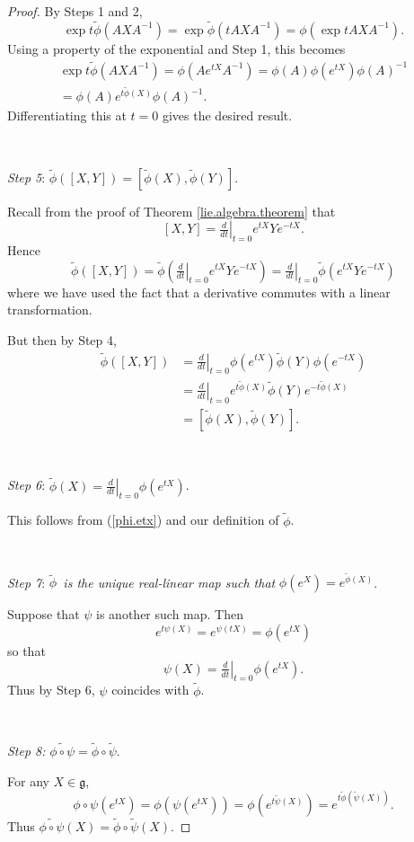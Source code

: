 \documentclass[12pt]{amsbook}
\let \frak = \mathfrak
\theoremstyle{plain}
\numberwithin{equation}{chapter}
\numberwithin{theorem}{chapter}
\begin{document}
\begin{proof}
By Steps 1 and 2,
\[
\exp t\widetilde{\phi}(AXA^{-1})=\exp\widetilde{\phi}(tAXA^{-1})=\phi\left(
\exp tAXA^{-1}\right)  \text{.}%
\]
Using a property of the exponential and Step 1, this becomes
\begin{align*}
\exp t\widetilde{\phi}(AXA^{-1})=\phi\left(  Ae^{tX}A^{-1}\right)
=\phi(A)\phi(e^{tX})\phi(A)^{-1}\\
=\phi(A)e^{t\widetilde{\phi}(X)}\phi(A)^{-1}\text{.}%
\end{align*}
Differentiating this at $t=0$ gives the desired result.

\ \ 

\textit{Step 5}: $\widetilde{\phi}(\left[  X,Y\right]  )=\left[
\widetilde{\phi}(X),\widetilde{\phi}(Y)\right]  $.

Recall from the proof of Theorem \ref{lie.algebra.theorem} that
\[
\left[  X,Y\right]  =\left.  \tfrac{d}{dt}\right|  _{t=0}e^{tX}Ye^{-tX}%
\text{.}%
\]
Hence
\[
\widetilde{\phi}\left(  \left[  X,Y\right]  \right)  =\widetilde{\phi}\left(
\left.  \tfrac{d}{dt}\right|  _{t=0}e^{tX}Ye^{-tX}\right)  =\left.  \tfrac
{d}{dt}\right|  _{t=0}\widetilde{\phi}\left(  e^{tX}Ye^{-tX}\right)
\]
where we have used the fact that a derivative commutes with a linear transformation.

But then by Step 4,
\begin{align*}
\widetilde{\phi}\left(  \left[  X,Y\right]  \right)    & =\left.  \tfrac
{d}{dt}\right|  _{t=0}\phi(e^{tX})\widetilde{\phi}(Y)\phi(e^{-tX})\\
& =\left.  \tfrac{d}{dt}\right|  _{t=0}e^{t\widetilde{\phi}(X)}\widetilde
{\phi}(Y)e^{-t\widetilde{\phi}(X)}\\
& =\left[  \widetilde{\phi}(X),\widetilde{\phi}(Y)\right]  \text{.}%
\end{align*}

\ 

\textit{Step 6}: $\widetilde{\phi}(X)=\left.  \tfrac{d}{dt}\right|  _{t=0}%
\phi(e^{tX})$.

This follows from (\ref{phi.etx}) and our definition of $\widetilde{\phi}$.

\ 

\textit{Step 7}: $\widetilde{\phi}$\textit{\ is the unique real-linear map
such that }$\phi(e^{X})=e^{\widetilde{\phi}(X)}$.

Suppose that $\psi$ is another such map. Then
\[
e^{t\psi(X)}=e^{\psi(tX)}=\phi(e^{tX})
\]
so that
\[
\psi(X)=\left.  \tfrac{d}{dt}\right|  _{t=0}\phi(e^{tX})\text{.}%
\]
Thus by Step 6, $\psi$ coincides with $\widetilde{\phi}$.

\ 

\textit{Step 8: }$\widetilde{\phi\circ\psi}=\widetilde{\phi}\circ
\widetilde{\psi}$.

For any $X\in\frak{g}$,
\[
\phi\circ\psi\left(  e^{tX}\right)  =\phi\left(  \psi\left(  e^{tX}\right)
\right)  =\phi\left(  e^{t\widetilde{\psi}(X)}\right)  =e^{t\widetilde{\phi
}(\widetilde{\psi}(X))}\text{.}%
\]
Thus $\widetilde{\phi\circ\psi}(X)=\widetilde{\phi}\circ\widetilde{\psi}(X)$.
\end{proof}
\end{document}
